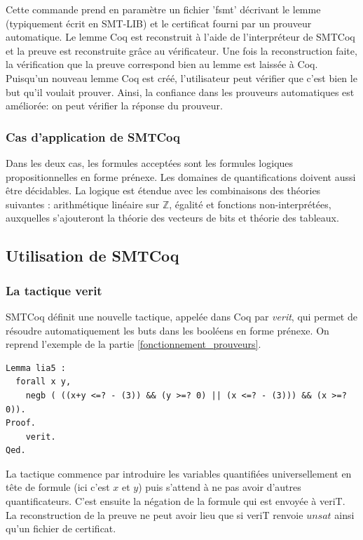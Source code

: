 \documentclass[11pt]{article}
\begin{document}
Cette commande prend en paramètre un fichier 'fsmt' décrivant le lemme (typiquement écrit en SMT-LIB) et le certificat fourni par un prouveur automatique. Le lemme Coq est reconstruit à l'aide de l'interpréteur de SMTCoq et la preuve est reconstruite grâce au vérificateur. Une fois la reconstruction faite, la vérification que la preuve correspond bien au lemme est laissée à Coq. \\

Puisqu'un nouveau lemme Coq est créé, l'utilisateur peut vérifier que c'est bien le but qu'il voulait prouver. Ainsi, la confiance dans les prouveurs automatiques est améliorée: on peut vérifier la réponse du prouveur.


\subsubsection{Cas d'application de SMTCoq}

Dans les deux cas, les formules acceptées sont les formules logiques propositionnelles en forme prénexe. Les domaines de quantifications doivent aussi être décidables. La logique est étendue avec les combinaisons des théories suivantes : arithmétique linéaire sur $\mathbb{Z}$, égalité et fonctions non-interprétées, auxquelles s'ajouteront la théorie des vecteurs de bits et théorie des tableaux. 

\subsection{Utilisation de SMTCoq}

\subsubsection{La tactique verit}

SMTCoq définit une nouvelle tactique, appelée dans Coq par \textit{verit}, qui permet de résoudre automatiquement les buts dans les booléens en forme prénexe. On reprend l'exemple de la partie \ref{fonctionnement_prouveurs}.


\begin{lstlisting}[frame=single]
Lemma lia5 : 
  forall x y,
    negb ( ((x+y <=? - (3)) && (y >=? 0) || (x <=? - (3))) && (x >=? 0)).
Proof.
    verit.
Qed.
\end{lstlisting}

La tactique commence par introduire les variables quantifiées universellement en tête de formule (ici c'est $x$ et $y$) puis s'attend à ne pas avoir d'autres quantificateurs. C'est ensuite la négation de la formule qui est envoyée à veriT. La reconstruction de la preuve ne peut avoir lieu que si veriT renvoie $unsat$ ainsi qu'un fichier de certificat.
\end{document}
